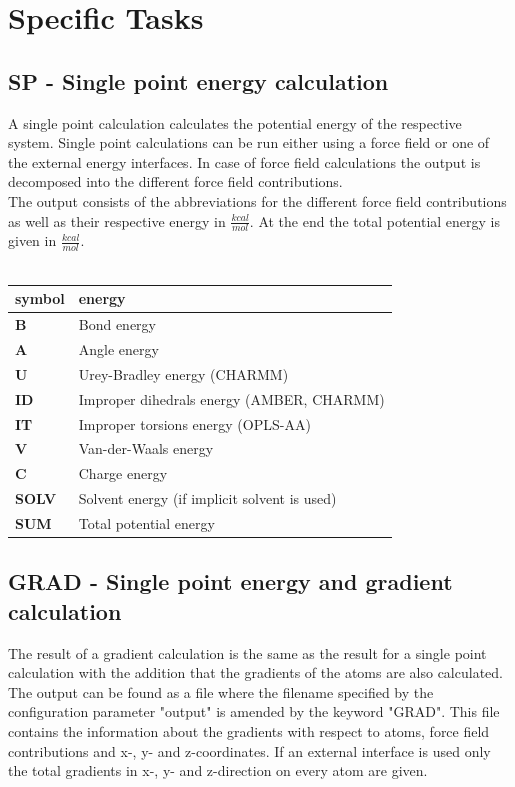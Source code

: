 \documentclass[10pt,a4paper]{article} %
\begin{document}
	\section{Specific Tasks}

	\subsection{SP - Single point energy calculation}
	A single point calculation calculates the potential energy of the respective system. Single point calculations can be run either using a force field or one of the external energy interfaces. In case of force field calculations the output is decomposed into the different force field contributions.\\

	The output consists of the abbreviations for the different force field contributions as well as their respective energy in $\frac{kcal}{mol}$. At the end the total potential energy is given in $\frac{kcal}{mol}$.\\~\\

	\begin{longtable}{l|l}
		symbol & energy\\
		\hline
		\textbf{B} & Bond energy\\
		\textbf{A} & Angle energy\\
		\textbf{U} & Urey-Bradley energy (\ac{CHARMM})\\
		\textbf{ID} & Improper dihedrals energy (\ac{AMBER}, \ac{CHARMM})\\
		\textbf{IT} & Improper torsions energy (\ac{OPLS-AA})\\
		\textbf{V} & Van-der-Waals energy\\
		\textbf{C} & Charge energy\\
		\textbf{SOLV} & Solvent energy (if implicit solvent is used)\\
		\textbf{SUM} & Total potential energy\\

	\end{longtable}


	\subsection{GRAD - Single point energy and gradient calculation}
	The result of a gradient calculation is the same as the result for a single point calculation with the addition that the gradients of the atoms are also calculated. The output can be found as a file where the filename specified by the configuration parameter "output" is amended by the keyword "GRAD". This file contains the information about the gradients with respect to atoms, force field contributions and x-, y- and z-coordinates. If an external interface is used only the total gradients in x-, y- and z-direction on every atom are given.
	
\end{document}
